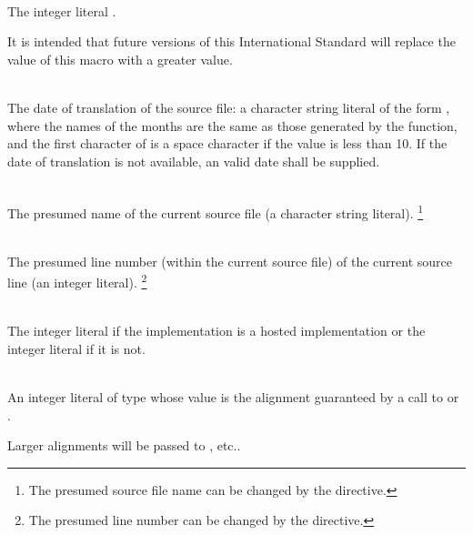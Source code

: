 \begin{description}

%
\item {}\\
The integer literal \tcode{\cppver}.
\begin{note}
It is intended that future
versions of this International Standard will
replace the value of this macro with a greater value.
\end{note}

%
\item {}\\
The date of translation of the source file:
a character string literal of the form
,
where the names of the months are the same as those generated
by the
function,
and the first character of
is a space character if the value is less than 10.
If the date of translation is not available,
an  valid date
shall be supplied.

%
\item {}\\
The presumed name of the current source file (a character string
literal).%
\footnote{The presumed source file name can be changed by the  directive.}

%
\item {}\\
The presumed line number (within the current source file) of the current source line
(an integer literal).%
\footnote{The presumed line number can be changed by the  directive.}

%
\item {}\\
The integer literal  if the implementation is a hosted
implementation or the integer literal  if it is not.

%
\item {}\\
An integer literal of type 
whose value is the alignment guaranteed
by a call to 
or .
\begin{note}
Larger alignments will be passed to
, etc..
\end{note}


\end{description}
